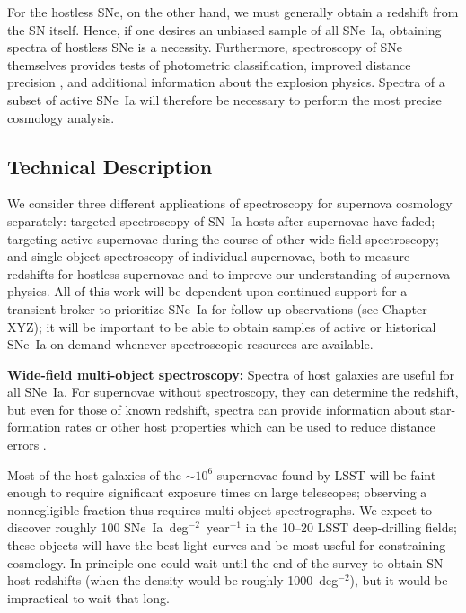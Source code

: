 For the hostless SNe, on the other
hand, we must generally obtain a redshift from the SN itself.  Hence, if one
desires an unbiased sample of all SNe~Ia, obtaining spectra of
hostless SNe is a necessity.  Furthermore, spectroscopy of SNe themselves provides tests of
photometric classification, improved distance precision
\citep{Bailey09, Blondin11, Foley11:vel}, and additional information
about the explosion physics.  Spectra of a subset of active SNe~Ia will therefore be necessary to
perform the most precise cosmology analysis.

\subsection{Technical Description}

We consider three different applications of spectroscopy for supernova cosmology separately: targeted spectroscopy of SN~Ia hosts after supernovae have faded; targeting active supernovae during the course of other wide-field spectroscopy; and single-object spectroscopy of individual supernovae, both to measure redshifts for hostless supernovae and to improve our understanding of supernova physics.  All of this work will be dependent upon continued support for a transient broker to prioritize SNe~Ia for follow-up observations (see Chapter XYZ);  it will be important to be able to obtain samples of active or historical SNe~Ia on demand whenever spectroscopic resources are available.   

{\bf Wide-field multi-object spectroscopy:}  Spectra of host galaxies are useful for all SNe~Ia.  For supernovae without spectroscopy, they can determine the redshift, but even for those of known redshift, spectra
can provide information about star-formation rates or other host properties which can
be used to reduce distance errors \citep[e.g.,][]{Pan14}.  

Most of the host galaxies of the $\sim 10^{6}$ supernovae found by LSST will be faint enough to
require significant exposure times on large telescopes; observing a nonnegligible fraction thus requires multi-object spectrographs.      
We expect to discover roughly 100 SNe~Ia~deg$^{-2}$~year$^{-1}$ in the 10--20 LSST
deep-drilling fields; these objects will have the best light curves and be most useful for constraining cosmology.  In principle one could wait until the end of the survey to obtain SN host redshifts (when the density would be roughly
1000~deg$^{-2}$), but it would be impractical to wait that long.  

